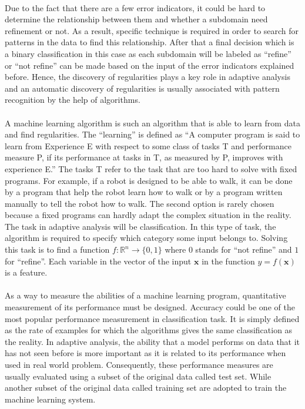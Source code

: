 \paragraph{}
Due to the fact that there are a few error indicators, it could be hard to determine the relationship between them and whether a subdomain need refinement or not.
As a result, specific technique is required in order to search for patterns in the data to find this relationship.
After that a final decision which is a binary classification in this case as each subdomain will be labeled as ``refine'' or ``not refine'' can be made based on the input of the error indicators explained before.
Hence, the discovery of regularities plays a key role in adaptive analysis and an automatic discovery of regularities is usually associated with pattern recognition by the help of algorithms.


\paragraph{}
A machine learning algorithm is such an algorithm that is able to learn from data and find regularities.
The ``learning'' is defined as ``A computer program is said to learn from Experience E with respect to some class of tasks T and performance measure P, if its performance at tasks in T, as measured by P, improves with experience E.'' \cite{Mitchell:1997:ML:541177}
The tasks T refer to the task that are too hard to solve with fixed programs.
For example, if a robot is designed to be able to walk, it can be done by a program that help the robot learn how to walk or by a program written manually to tell the robot how to walk.
The second option is rarely chosen because a fixed programs can hardly adapt the complex situation in the reality.
The task in adaptive analysis will be classification.
In this type of task, the algorithm is required to specify which category some input belongs to.
Solving this task is to find a function $f: \mathbb{R}^n \rightarrow \{0,1\}$ where $0$ stands for ``not refine'' and $1$ for ``refine''.
Each variable in the vector of the input $\pmb{x}$ in the function $y=f(\pmb{x})$ is a feature.

\paragraph{}
As a way to measure the abilities of a machine learning program, quantitative measurement of its performance must be designed.
Accuracy could be one of the most popular performance measurement in classification task.
It is simply defined as the rate of examples for which the algorithms gives the same classification as the reality.
In adaptive analysis, the ability that a model performs on data that it has not seen before is more important as it is related to its performance when used in real world problem.
Consequently, these performance measures are usually evaluated using a subset of the original data called test set.
While another subset of the original data called training set are adopted to train the machine learning system.



